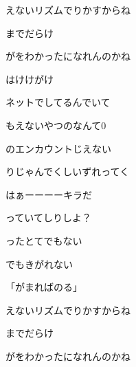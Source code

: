 \documentclass[a4paper,tate,twocolumn,12pt]{ltjtarticle}
\begin{document}
\begin{flushleft}
\vspace{2em}

\noindent\begin{minipage}{\linewidth}
えないリズムでりかすからね

までだらけ

がをわかったになれんのかね

はけけがけ
\end{minipage}

\vspace{2em}

\noindent\begin{minipage}{\linewidth}
ネットでしてるんでいて

もえないやつのなんて0

のエンカウントじえない

りじゃんでくしいずれってく
\end{minipage}

\vspace{2em}

\noindent\begin{minipage}{\linewidth}
はぁーーーーキラだ

っていてしりしよ？

ったとてでもない

でもきがれない

「がまればのる」
\end{minipage}

\vspace{2em}

\noindent\begin{minipage}{\linewidth}
えないリズムでりかすからね

までだらけ

がをわかったになれんのかね


\end{minipage}
\end{flushleft}
\end{document}
